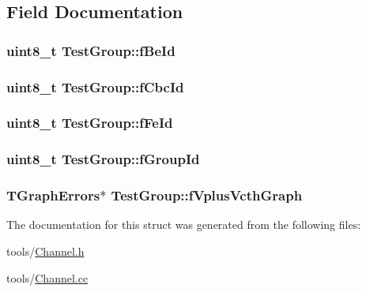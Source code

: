 \subsection{Field Documentation}
\hypertarget{struct_test_group_a220aae8ee3ae8c357f1787e3625431b4}{
\subsubsection[{f\-Be\-Id}]{\setlength{\rightskip}{0pt plus 5cm}uint8\-\_\-t Test\-Group\-::f\-Be\-Id}}\label{struct_test_group_a220aae8ee3ae8c357f1787e3625431b4}
\hypertarget{struct_test_group_ac29315115540d3e0fc74b2dba3771162}{
\subsubsection[{f\-Cbc\-Id}]{\setlength{\rightskip}{0pt plus 5cm}uint8\-\_\-t Test\-Group\-::f\-Cbc\-Id}}\label{struct_test_group_ac29315115540d3e0fc74b2dba3771162}
\hypertarget{struct_test_group_a0eaafe2a6411b3865c90240b36b24840}{
\subsubsection[{f\-Fe\-Id}]{\setlength{\rightskip}{0pt plus 5cm}uint8\-\_\-t Test\-Group\-::f\-Fe\-Id}}\label{struct_test_group_a0eaafe2a6411b3865c90240b36b24840}
\hypertarget{struct_test_group_a425092488cd04f3f22fdf8dfe0e877ed}{
\subsubsection[{f\-Group\-Id}]{\setlength{\rightskip}{0pt plus 5cm}uint8\-\_\-t Test\-Group\-::f\-Group\-Id}}\label{struct_test_group_a425092488cd04f3f22fdf8dfe0e877ed}
\hypertarget{struct_test_group_a1481302f545d48c3185534280d55b545}{
\subsubsection[{f\-Vplus\-Vcth\-Graph}]{\setlength{\rightskip}{0pt plus 5cm}T\-Graph\-Errors$\ast$ Test\-Group\-::f\-Vplus\-Vcth\-Graph}}\label{struct_test_group_a1481302f545d48c3185534280d55b545}


The documentation for this struct was generated from the following files\-:\begin{DoxyCompactItemize}
\item 
tools/\hyperlink{_channel_8h}{Channel.\-h}\item 
tools/\hyperlink{_channel_8cc}{Channel.\-cc}\end{DoxyCompactItemize}
